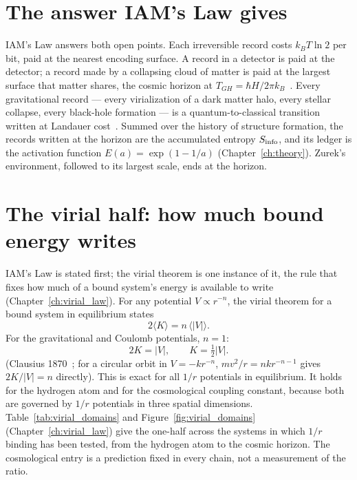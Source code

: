 \section{The answer IAM's Law gives}\label{sec:qr_answer}
IAM's Law answers both open points. Each irreversible record costs $k_BT\ln2$ per bit, paid at the nearest encoding surface. A record in a detector is
paid at the detector; a record made by a collapsing cloud of matter is paid at the largest surface that matter shares, the cosmic horizon at
$T_{GH}=\hbar H/2\pi k_B$~\cite{GibbonsHawking1977}. Every gravitational record --- every virialization of a dark matter halo, every stellar collapse,
every black-hole formation --- is a quantum-to-classical transition written at Landauer cost~\cite{Landauer1961}. Summed over the history of structure
formation, the records written at the horizon are the accumulated entropy $S_{\rm info}$, and its ledger is the activation function $E(a)=\exp(1-1/a)$
(Chapter~\ref{ch:theory}). Zurek's environment, followed to its largest scale, ends at the horizon. \interp

\section{The virial half: how much bound energy writes}\label{sec:qr_virial}
IAM's Law is stated first; the virial theorem is one instance of it, the rule that fixes how much of a bound system's energy is available to write
(Chapter~\ref{ch:virial_law}). For any potential $V\propto r^{-n}$, the virial theorem for a bound system in equilibrium states
\begin{equation}
2\langle K\rangle=n\,\langle|V|\rangle .\label{eq:qr_virial_n}
\end{equation}
For the gravitational and Coulomb potentials, $n=1$:
\begin{equation}
2K=|V|,\qquad K=\tfrac12|V| .\label{eq:qr_virial_1}
\end{equation}
\derived{} (Clausius 1870~\cite{Clausius1870}; for a circular orbit in $V=-kr^{-n}$, $mv^2/r=nkr^{-n-1}$ gives $2K/|V|=n$ directly). This is exact for
all $1/r$ potentials in equilibrium. It holds for the hydrogen atom and for the cosmological coupling constant, because both are governed by $1/r$
potentials in three spatial dimensions. Table~\ref{tab:virial_domains} and Figure~\ref{fig:virial_domains} (Chapter~\ref{ch:virial_law}) give the
one-half across the systems in which $1/r$ binding has been tested, from the hydrogen atom to the cosmic horizon. The cosmological entry is a prediction
fixed in every chain, not a measurement of the ratio.

